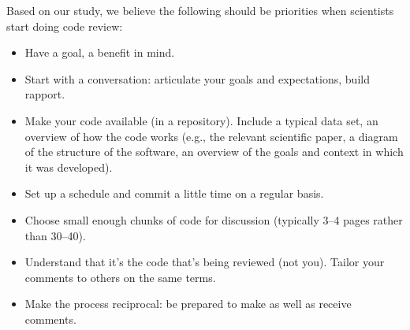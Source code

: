 \documentclass[10pt,twocolumn]{article}
\begin{document}
Based on our study,
we believe the following should be priorities when scientists start doing code review:

\begin{itemize}

\item Have a goal, a benefit in mind.

\item Start with a conversation:
articulate your goals and expectations, build rapport.

\item Make your code available (in a repository).
Include a typical data set, an overview of how the code works
(e.g.,
the relevant scientific paper,
a diagram of the structure of the software,
an overview of the goals and context in which it was developed).

\item Set up a schedule and commit a little time on a regular basis.

\item Choose small enough chunks of code for discussion (typically 3--4 pages rather than 30--40).

\item Understand that it's the code that's being reviewed (not you).
Tailor your comments to others on the same terms.

\item Make the process reciprocal:
be prepared to make as well as receive comments.

\end{itemize}

{\small


}
\end{document}
